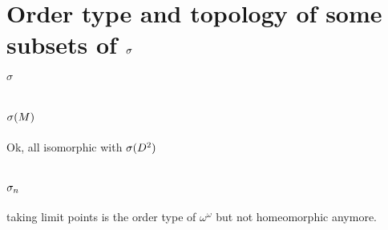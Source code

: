 \section{Order type and topology of some subsets of ${\sigma}$}
$\sigma$

\section{${{\sigma}(M)}$}
Ok, all isomorphic with ${{\sigma}(D^2)}$
\section{${\sigma}_n$}
taking limit points is the order type of $\omega^\omega$ but not homeomorphic anymore. 







